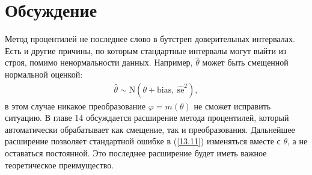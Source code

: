 \section{Обсуждение}
Метод процентилей не последнее слово в бутстреп доверительных интервалах. Есть и другие причины, по которым стандартные интервалы могут выйти из строя, помимо ненормальности данных. Например, $\widehat{\theta}$ может быть смещенной нормальной оценкой:
\begin{gather}\label{13.11}
\widehat{\theta} \sim \mathrm{N}(\theta+\text{bias},\  \widehat{\text{se}}^{2}),
\end{gather}
в этом случае никакое преобразование $\varphi = m(\theta)$ не сможет исправить ситуацию. В главе 14 обсуждается расширение метода процентилей, который автоматически обрабатывает как смещение, так и преобразования. Дальнейшее расширение позволяет стандартной ошибке в (\ref{13.11}) изменяться вместе с $\theta$, а не оставаться постоянной. Это последнее расширение будет иметь важное теоретическое преимущество.

